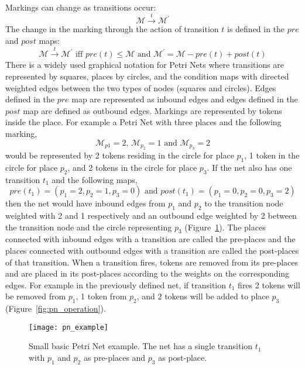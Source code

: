 Markings can change as transitions occur:
\begin{equation*}
\mathcal{M}\overset{t}{\longrightarrow}\mathcal{M^\prime}
\end{equation*}
The change in the marking through the action of transition $t$ is
defined in the $pre$ and $post$ maps:
\begin{equation*}
\mathcal{M}\overset{t}{\longrightarrow}\mathcal{M^\prime} \mbox{ iff } pre(t) \leq \mathcal{M} \mbox{ and } \mathcal{M^\prime} = \mathcal{M} - pre(t) + post(t)
\end{equation*}
There is a widely used graphical notation for Petri Nets where
transitions are represented by squares, places by circles, and the
condition maps with directed weighted edges between the two types of
nodes (squares and circles). Edges defined in the $pre$ map are
represented as inbound edges and edges defined in the $post$ map are
defined as outbound edges. Markings are represented by tokens inside
the place. For example a Petri Net with three places and the following
marking,
\begin{equation*}
\mathcal{M}_{p1} = 2\mbox{, } \mathcal{M}_{p_2}=1 \mbox{ and } \mathcal{M}_{p_3} = 2
\end{equation*}
would be represented by 2 tokens residing in the circle for place
$p_1$, 1 token in the circle for place $p_2$, and 2 tokens in the
circle for place $p_3$. If the net also has one transition $t_1$ and
the following maps,
\begin{equation*}
pre(t_1) = (p_1 = 2, p_2 = 1, p_3=0) \mbox{ and } post(t_1) = (p_1
=0, p_2=0, p_3=2)
\end{equation*}
then the net would have inbound edges from $p_1$ and $p_2$ to the
transition node weighted with 2 and 1 respectively and an outbound edge
weighted by 2 between the transition node and the circle representing
$p_3$ (Figure~\ref{fig:pn_example}). The places connected with
inbound edges with a transition are called the pre-places and the
places connected with outbound edges with a transition are called the
post-places of that transition. When a transition fires, tokens are removed from its
pre-places and are placed in its post-places according to the weights
on the corresponding edges. For example in the previously defined net,
if transition $t_1$ fires 2 tokens will be removed from $p_1$, 1 token
from $p_2$, and 2 tokens will be added to place $p_3$ (Figure~\ref{fig:pn_operation}).

\begin{figure}
\centering
\texttt{[image: pn\_example]}
\caption[Small basic Petri Net example]{Small basic Petri Net example. The net has a single
  transition $t_1$ with $p_1$ and $p_2$ as pre-places and $p_3$ as post-place.}
\label{fig:pn_example}
\end{figure}

